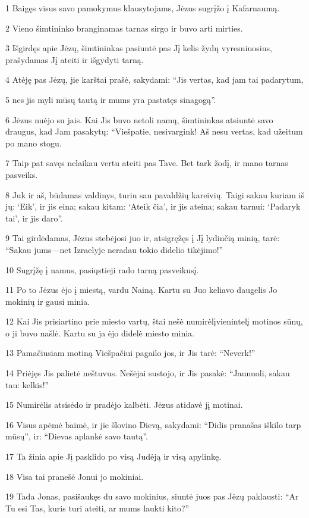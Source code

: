 \par 1 Baigęs visus savo pamokymus klausytojams, Jėzus sugrįžo į Kafarnaumą. 
\par 2 Vieno šimtininko branginamas tarnas sirgo ir buvo arti mirties. 
\par 3 Išgirdęs apie Jėzų, šimtininkas pasiuntė pas Jį kelis žydų vyresniuosius, prašydamas Jį ateiti ir išgydyti tarną. 
\par 4 Atėję pas Jėzų, jie karštai prašė, sakydami: “Jis vertas, kad jam tai padarytum, 
\par 5 nes jis myli mūsų tautą ir mums yra pastatęs sinagogą”. 
\par 6 Jėzus nuėjo su jais. Kai Jis buvo netoli namų, šimtininkas atsiuntė savo draugus, kad Jam pasakytų: “Viešpatie, nesivargink! Aš nesu vertas, kad užeitum po mano stogu. 
\par 7 Taip pat savęs nelaikau vertu ateiti pas Tave. Bet tark žodį, ir mano tarnas pasveiks. 
\par 8 Juk ir aš, būdamas valdinys, turiu sau pavaldžių kareivių. Taigi sakau kuriam iš jų: ‘Eik’, ir jis eina; sakau kitam: ‘Ateik čia’, ir jis ateina; sakau tarnui: ‘Padaryk tai’, ir jis daro”. 
\par 9 Tai girdėdamas, Jėzus stebėjosi juo ir, atsigręžęs į Jį lydinčią minią, tarė: “Sakau jums—net Izraelyje neradau tokio didelio tikėjimo!” 
\par 10 Sugrįžę į namus, pasiųstieji rado tarną pasveikusį. 
\par 11 Po to Jėzus ėjo į miestą, vardu Nainą. Kartu su Juo keliavo daugelis Jo mokinių ir gausi minia. 
\par 12 Kai Jis prisiartino prie miesto vartų, štai nešė numirėlį­vienintelį motinos sūnų, o ji buvo našlė. Kartu su ja ėjo didelė miesto minia. 
\par 13 Pamačiusiam motiną Viešpačiui pagailo jos, ir Jis tarė: “Neverk!” 
\par 14 Priėjęs Jis palietė neštuvus. Nešėjai sustojo, ir Jis pasakė: “Jaunuoli, sakau tau: kelkis!” 
\par 15 Numirėlis atsisėdo ir pradėjo kalbėti. Jėzus atidavė jį motinai. 
\par 16 Visus apėmė baimė, ir jie šlovino Dievą, sakydami: “Didis pranašas iškilo tarp mūsų”, ir: “Dievas aplankė savo tautą”. 
\par 17 Ta žinia apie Jį pasklido po visą Judėją ir visą apylinkę. 
\par 18 Visa tai pranešė Jonui jo mokiniai. 
\par 19 Tada Jonas, pasišaukęs du savo mokinius, siuntė juos pas Jėzų paklausti: “Ar Tu esi Tas, kuris turi ateiti, ar mums laukti kito?” 
